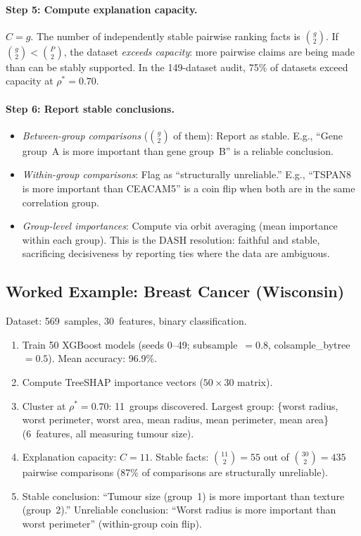\documentclass[11pt]{article}
\begin{document}
\paragraph{Step 5: Compute explanation capacity.}
$C = g$.  The number of independently stable pairwise ranking facts is $\binom{g}{2}$.  If $\binom{g}{2} < \binom{P}{2}$, the dataset \emph{exceeds capacity}: more pairwise claims are being made than can be stably supported.  In the 149-dataset audit, 75\% of datasets exceed capacity at $\rho^* = 0.70$.

\paragraph{Step 6: Report stable conclusions.}
\begin{itemize}
  \item \emph{Between-group comparisons} ($\binom{g}{2}$ of them): Report as stable.  E.g., ``Gene group~A is more important than gene group~B'' is a reliable conclusion.
  \item \emph{Within-group comparisons}: Flag as ``structurally unreliable.''  E.g., ``TSPAN8 is more important than CEACAM5'' is a coin flip when both are in the same correlation group.
  \item \emph{Group-level importances}: Compute via orbit averaging (mean importance within each group).  This is the DASH resolution: faithful and stable, sacrificing decisiveness by reporting ties where the data are ambiguous.
\end{itemize}

\subsection{Worked Example: Breast Cancer (Wisconsin)}

Dataset: 569~samples, 30~features, binary classification.

\begin{enumerate}
  \item Train 50 XGBoost models (seeds 0--49; subsample~$= 0.8$, colsample\_bytree~$= 0.5$).  Mean accuracy: 96.9\%.
  \item Compute TreeSHAP importance vectors ($50 \times 30$ matrix).
  \item Cluster at $\rho^* = 0.70$: 11~groups discovered.  Largest group: \{worst radius, worst perimeter, worst area, mean radius, mean perimeter, mean area\} (6~features, all measuring tumour size).
  \item Explanation capacity: $C = 11$.  Stable facts: $\binom{11}{2} = 55$ out of $\binom{30}{2} = 435$ pairwise comparisons (87\% of comparisons are structurally unreliable).
  \item Stable conclusion: ``Tumour size (group~1) is more important than texture (group~2).''  Unreliable conclusion: ``Worst radius is more important than worst perimeter'' (within-group coin flip).
\end{enumerate}
\end{document}
